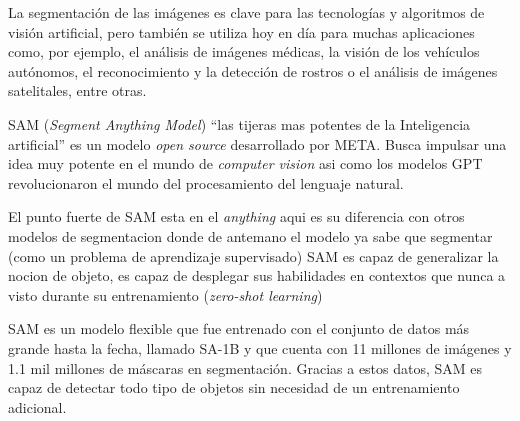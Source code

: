 \documentclass[runningheads]{llncs} %
\begin{document}
La segmentación de las imágenes es clave para las tecnologías y 
algoritmos de visión artificial, pero también se utiliza hoy en día para 
muchas aplicaciones como, por ejemplo, el análisis de imágenes médicas, 
la visión de los vehículos autónomos, el reconocimiento y la detección de 
rostros o el análisis de imágenes satelitales, entre otras. \cite{ej3-SAM}

SAM (\textit{Segment Anything Model}) \textquotedblleft{}las tijeras mas
potentes de la Inteligencia artificial\textquotedblright{} es un modelo
\textit{open source} desarrollado por META.
Busca impulsar una idea muy potente en el mundo de \textit{computer vision} asi
como los modelos GPT revolucionaron el mundo del procesamiento del lenguaje natural.
\cite{ej-SAM}

El punto fuerte de SAM esta en el \textit{anything} aqui es su diferencia con otros
modelos de segmentacion donde de antemano el modelo ya sabe que segmentar (como
un problema de aprendizaje supervisado) SAM es capaz de generalizar la nocion de
objeto, es capaz de desplegar sus habilidades en contextos que nunca a visto durante
su entrenamiento (\textit{zero-shot learning}) \cite{ej-SAM}

SAM es un modelo flexible que fue entrenado con el conjunto de datos más grande
hasta la fecha, llamado SA-1B y que cuenta con 11 millones de imágenes y 1.1 mil millones 
de máscaras en segmentación. Gracias a estos datos, SAM es capaz de detectar todo tipo de 
objetos sin necesidad de un entrenamiento adicional. \cite{ej3-SAM}
\end{document}
